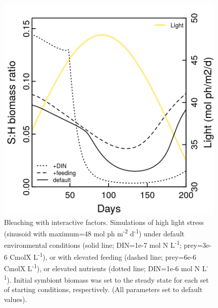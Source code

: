 \documentclass[]{elsarticle} %
\makeatletter
\def\maxwidth{\ifdim\Gin@nat@width>\linewidth\linewidth
\else\Gin@nat@width\fi}
\let\Oldincludegraphics\includegraphics
\renewcommand{\includegraphics}[1]{\Oldincludegraphics[width=\maxwidth]{#1}}
\makeatother
\begin{document}
\begin{figure}[htbp]
\centering
\includegraphics{../img/Fig7.png}
\caption{Bleaching with interactive factors. Simulations of high light
stress (sinusoid with maximum=48 mol ph m\textsuperscript{-2}
d\textsuperscript{-1}) under default environmental conditions (solid
line; DIN=1e-7 mol N L\textsuperscript{-1}; prey=3e-6 CmolX
L\textsuperscript{-1}), or with elevated feeding (dashed line; prey=6e-6
CmolX L\textsuperscript{-1}), or elevated nutrients (dotted line;
DIN=1e-6 mol N L\textsuperscript{-1}). Initial symbiont biomass was set
to the steady state for each set of starting conditions, respectively.
(All parameters set to default values).}
\end{figure}
\end{document}
